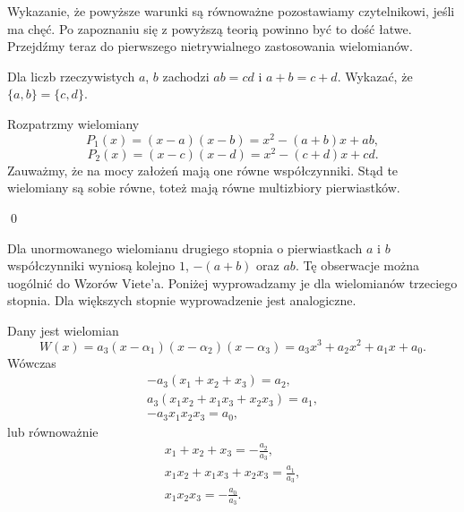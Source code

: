 \vspace{5px}
\noindent
Wykazanie, że powyższe warunki są równoważne pozostawiamy czytelnikowi, jeśli ma chęć. Po zapoznaniu się z powyższą teorią powinno być to dość łatwe. Przejdźmy teraz do pierwszego nietrywialnego zastosowania wielomianów.

\vspace{5px}


\noindent
Dla liczb rzeczywistych $a$, $b$ zachodzi $ab = cd$ i $a + b = c + d$. Wykazać, że $\{a, b\} = \{c, d\}$.

\vspace{5px}


\noindent
Rozpatrzmy wielomiany
\[
    P_1(x) = (x - a)(x - b) = x^2 - (a + b)x + ab,
\]
\[
    P_2(x) = (x - c)(x - d) = x^2 - (c + d)x + cd.
\]
Zauważmy, że na mocy założeń mają one równe współczynniki. Stąd te wielomiany są sobie równe, toteż mają równe multizbiory pierwiastków.

\qed

\vspace{5px}

\noindent
Dla unormowanego wielomianu drugiego stopnia o pierwiastkach $a$ i $b$ współczynniki wyniosą kolejno $1$, $-(a + b)$ oraz $ab$. Tę obserwacje można uogólnić do Wzorów Viete'a. Poniżej wyprowadzamy je dla wielomianów trzeciego stopnia. Dla większych stopnie wyprowadzenie jest analogiczne. 

\newpage


\noindent
Dany jest wielomian
\[
     W(x) = a_3(x - \alpha_1)(x - \alpha_2)(x - \alpha_3) = a_3x^3 + a_2x^2 + a_1x + a_0.
\]
Wówczas 
\begin{align*}
-a_3(x_1 + x_2 + x_3) = a_2, \\
a_3(x_1x_2 + x_1x_3 + x_2x_3) = a_1, \\
-a_3x_1x_2x_3 = a_0,
\end{align*}
lub równoważnie
\begin{align*}
x_1 + x_2 + x_3 = -\frac{a_2}{a_3}, \\
x_1x_2 + x_1x_3 + x_2x_3 = \frac{a_1}{a_3}, \\
x_1x_2x_3 = -\frac{a_0}{a_3}.
\end{align*}
